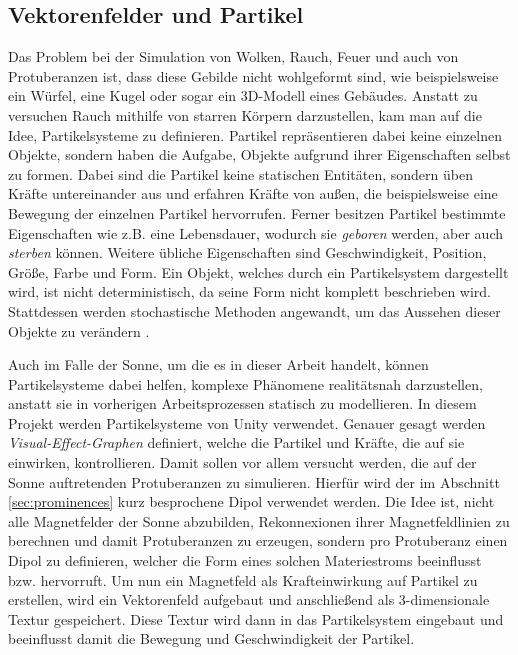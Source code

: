 \subsection{Vektorenfelder und Partikel}
Das Problem bei der Simulation von Wolken, Rauch, Feuer und auch von
Protuberanzen ist, dass diese Gebilde nicht wohlgeformt sind, wie
beispielsweise ein Würfel, eine Kugel oder sogar ein 3D-Modell eines
Gebäudes. Anstatt zu versuchen Rauch mithilfe von starren Körpern
darzustellen, kam man auf die Idee, Partikelsysteme zu definieren. Partikel
repräsentieren dabei keine einzelnen Objekte, sondern haben die Aufgabe,
Objekte aufgrund ihrer Eigenschaften selbst zu formen. Dabei sind die Partikel
keine statischen Entitäten, sondern üben Kräfte untereinander aus und erfahren
Kräfte von außen, die beispielsweise eine Bewegung der einzelnen Partikel
hervorrufen. Ferner besitzen Partikel bestimmte Eigenschaften wie z.B. eine
Lebensdauer, wodurch sie \textit{geboren} werden, aber auch \textit{sterben}
können. Weitere übliche Eigenschaften sind Geschwindigkeit, Position, Größe,
Farbe und Form. Ein Objekt, welches durch ein Partikelsystem dargestellt
wird, ist nicht deterministisch, da seine Form nicht komplett beschrieben
wird. Stattdessen werden stochastische Methoden angewandt, um das Aussehen
dieser Objekte zu verändern \cite{Reeves1983}.

Auch im Falle der Sonne, um die es in dieser Arbeit handelt, können
Partikelsysteme dabei helfen, komplexe Phänomene realitätsnah darzustellen,
anstatt sie in vorherigen Arbeitsprozessen statisch zu modellieren. In diesem
Projekt werden Partikelsysteme von Unity verwendet. Genauer gesagt werden
\textit{Visual-Effect-Graphen} definiert, welche die Partikel und Kräfte, die
auf sie einwirken, kontrollieren. Damit sollen vor allem versucht werden, die
auf der Sonne auftretenden Protuberanzen zu simulieren. Hierfür wird der im
Abschnitt \ref{sec:prominences} kurz besprochene Dipol verwendet werden. Die
Idee ist, nicht alle Magnetfelder der Sonne abzubilden, Rekonnexionen ihrer
Magnetfeldlinien zu berechnen und damit Protuberanzen zu erzeugen, sondern
pro Protuberanz einen Dipol zu definieren, welcher die Form eines solchen
Materiestroms beeinflusst bzw. hervorruft. Um nun ein Magnetfeld als
Krafteinwirkung auf Partikel zu erstellen, wird ein Vektorenfeld aufgebaut
und anschließend als 3-dimensionale Textur gespeichert. Diese Textur wird
dann in das Partikelsystem eingebaut und beeinflusst damit die Bewegung und
Geschwindigkeit der Partikel.


